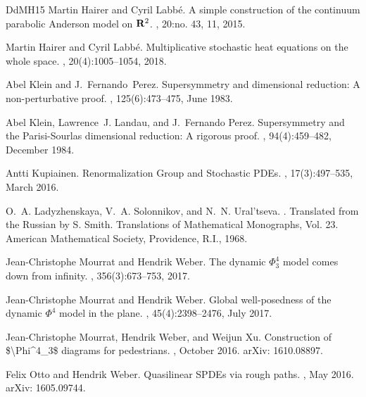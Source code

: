 \documentclass[a4paper,11pt]{article}
\numberwithin{equation}{section}
\newcommand{\8}{\infty}
\begin{document}
\begin{thebibliography}{DdMH15}
Martin Hairer and Cyril Labb\'e.
\newblock A simple construction of the continuum parabolic {A}nderson model on
  {${\bf R}^2$}.
, 20:no. 43, 11, 2015.

Martin Hairer and Cyril Labb\'e.
\newblock Multiplicative stochastic heat equations on the whole space.
, 20(4):1005--1054, 2018.

Abel Klein and J.~Fernando~Perez.
\newblock Supersymmetry and dimensional reduction: {A} non-perturbative proof.
, 125(6):473--475, June 1983.

Abel Klein, Lawrence~J. Landau, and J.~Fernando Perez.
\newblock Supersymmetry and the {Parisi}-{Sourlas} dimensional reduction: {A}
  rigorous proof.
, 94(4):459--482,
  December 1984.

Antti Kupiainen.
\newblock Renormalization {Group} and {Stochastic} {PDEs}.
, 17(3):497--535, March 2016.

O.~A. Ladyzhenskaya, V.~A. Solonnikov, and N.~N. Ural'tseva.
.
\newblock Translated from the Russian by S. Smith. Translations of Mathematical
  Monographs, Vol. 23. American Mathematical Society, Providence, R.I., 1968.

Jean-Christophe Mourrat and Hendrik Weber.
\newblock The dynamic {$\Phi^4_3$} model comes down from infinity.
, 356(3):673--753, 2017.

Jean-Christophe Mourrat and Hendrik Weber.
\newblock Global well-posedness of the dynamic {$\Phi^4$} model in the plane.
, 45(4):2398--2476, July 2017.

Jean-Christophe Mourrat, Hendrik Weber, and Weijun Xu.
\newblock Construction of \${\textbackslash}{Phi}{\textasciicircum}4\_3\$
  diagrams for pedestrians.
, October 2016.
\newblock arXiv: 1610.08897.

Felix Otto and Hendrik Weber.
\newblock Quasilinear {SPDEs} via rough paths.
, May 2016.
\newblock arXiv: 1605.09744.


\end{thebibliography}
\end{document}
